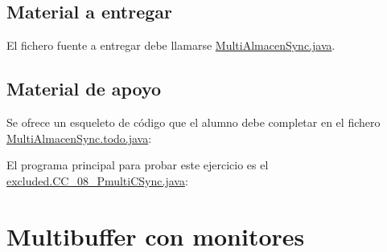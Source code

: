 \documentclass{article}
\begin{document}
\subsection*{Material a entregar}
El fichero fuente a entregar debe llamarse \url{MultiAlmacenSync.java}.

\subsection*{Material de apoyo}
Se ofrece un esqueleto de código que el alumno debe completar en el fichero
\url{MultiAlmacenSync.todo.java}:


El programa principal para probar este ejercicio es el
\url{excluded.CC_08_PmultiCSync.java}:


\clearpage

\section{Multibuffer con monitores}




\end{document}

